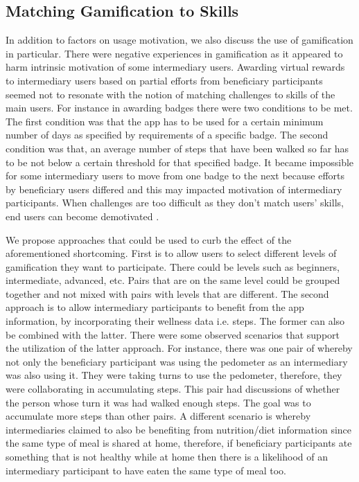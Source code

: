 \documentclass{sig-alternate}
\begin{document}
\subsection{Matching Gamification to Skills}
In addition to factors on usage motivation, we also discuss the use of gamification in particular. There were negative experiences in  gamification as it  appeared to harm intrinsic motivation of some intermediary users. Awarding virtual rewards to intermediary users based on partial efforts from beneficiary participants seemed not to resonate with the notion of matching challenges to skills of the main users. For instance in awarding badges there were two conditions to be met. The first condition was that the app has to be used for a certain minimum number of days as specified by requirements of a specific badge. The second condition was that, an average number of steps that have been walked so far has to be not below a certain threshold for that specified badge. It became impossible for some intermediary users to move from one badge to the next because efforts by beneficiary users differed and this may impacted motivation of intermediary participants. When challenges are too difficult as they don't match users' skills, end users can become demotivated \cite{zhang2008:motivational}.

We propose approaches that could be used to curb the effect of the  aforementioned shortcoming. First is to allow users to select different levels of gamification they want to participate. There could be levels such as beginners, intermediate, advanced, etc. Pairs that are on the same level could be grouped together and not mixed with pairs with levels that are different. The second approach is to allow intermediary participants to benefit from the app information, by incorporating their wellness data i.e. steps. The former can also be combined with the latter. There were some observed scenarios that support the utilization of the latter approach. For instance, there was one pair of whereby not only the beneficiary participant was using the pedometer as an intermediary was also using it. They were taking turns to use the pedometer, therefore, they were collaborating in accumulating steps. This pair had discussions of whether the person whose turn it was had walked enough steps. The goal was to accumulate more steps than other pairs. A different scenario is whereby intermediaries claimed to also be benefiting from nutrition/diet information since the same type of meal is shared at home, therefore, if beneficiary participants ate something that is not healthy while at home then there is a likelihood of an intermediary participant to have eaten the same type of meal too.
\end{document}
